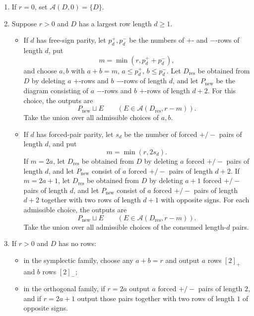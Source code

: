 \documentclass[
]{article}
\providecommand{\tightlist}{%
  \setlength{\itemsep}{0pt}\setlength{\parskip}{0pt}}
\begin{document}
\begin{enumerate}
\def\labelenumi{\arabic{enumi}.}
\tightlist
\item
  If \(r=0\), set \(\mathcal A(D,0)=\{D\}\).
\item
  Suppose \(r>0\) and \(D\) has a largest row length \(d\ge 1\).

  \begin{itemize}
  \tightlist
  \item
    If \(d\) has free-sign parity, let \(p_d^+,p_d^-\) be the numbers of
    \(+\)- and \(-\)-rows of length \(d\), put \[
    m=\min(r,p_d^++p_d^-),
    \] and choose \(a,b\) with \(a+b=m\), \(a\le p_d^+\),
    \(b\le p_d^-\). Let \(D_{\mathrm{res}}\) be obtained from \(D\) by
    deleting \(a\) \(+\)-rows and \(b\) \(-\)-rows of length \(d\), and
    let \(P_{\mathrm{new}}\) be the diagram consisting of \(a\)
    \(-\)-rows and \(b\) \(+\)-rows of length \(d+2\). For this choice,
    the outputs are \[
    P_{\mathrm{new}}\sqcup E
    \qquad(E\in \mathcal A(D_{\mathrm{res}},r-m)).
    \] Take the union over all admissible choices of \(a,b\).
  \item
    If \(d\) has forced-pair parity, let \(s_d\) be the number of forced
    \(+/-\) pairs of length \(d\), and put \[
    m=\min(r,2s_d).
    \] If \(m=2a\), let \(D_{\mathrm{res}}\) be obtained from \(D\) by
    deleting \(a\) forced \(+/-\) pairs of length \(d\), and let
    \(P_{\mathrm{new}}\) consist of \(a\) forced \(+/-\) pairs of length
    \(d+2\). If \(m=2a+1\), let \(D_{\mathrm{res}}\) be obtained from
    \(D\) by deleting \(a+1\) forced \(+/-\) pairs of length \(d\), and
    let \(P_{\mathrm{new}}\) consist of \(a\) forced \(+/-\) pairs of
    length \(d+2\) together with two rows of length \(d+1\) with
    opposite signs. For each admissible choice, the outputs are \[
    P_{\mathrm{new}}\sqcup E
    \qquad(E\in \mathcal A(D_{\mathrm{res}},r-m)).
    \] Take the union over all admissible choices of the consumed
    length-\(d\) pairs.
  \end{itemize}
\item
  If \(r>0\) and \(D\) has no rows:

  \begin{itemize}
  \tightlist
  \item
    in the symplectic family, choose any \(a+b=r\) and output \(a\) rows
    \([2]_+\) and \(b\) rows \([2]_-\);
  \item
    in the orthogonal family, if \(r=2a\) output \(a\) forced \(+/-\)
    pairs of length \(2\), and if \(r=2a+1\) output those pairs together
    with two rows of length \(1\) of opposite signs.
  \end{itemize}
\end{enumerate}
\end{document}
